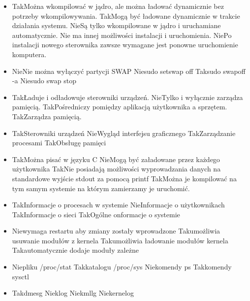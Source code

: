 \begin{itemize}
	\item {}
	{Tak}{Można wkompilować w jądro, ale można ładować dynamicznie bez potrzeby wkompilowywania.}
	{Tak}{Mogą być ładowane dynamicznie w trakcie działania systemu.}
	{Nie}{Są tylko wkompilowane w jądro i uruchamiane automatycznie. Nie ma innej możliwości instalacji i uruchomienia.}
	{Nie}{Po instalacji nowego sterownika zawsze wymagane jest ponowne uruchomienie komputera.}
	
	\item {}
	{Nie}{Nie można wyłączyć partycji SWAP}
	{Nie}{sudo setswap off}
	{Tak}{sudo swapoff -a}
	{Nie}{sudo swap stop}
	
	\item {}
	{Tak}{Ładuje i odładowuje sterowniki urządzeń.}
	{Nie}{Tylko i wyłącznie zarządza pamięcią.}
	{Tak}{Pośredniczy pomiędzy aplikacją użytkownika a sprzętem.}
	{Tak}{Zarządza pamięcią.}
	
	\item {}
	{Tak}{Sterowniki urządzeń}
	{Nie}{Wygląd interfejsu graficznego}
	{Tak}{Zarządzanie procesami}
	{Tak}{Obsługę pamięci}
	
	\item {}
	{Tak}{Można pisać w języku C}
	{Nie}{Mogą być załadowane przez każdego użytkownika}
	{Tak}{Nie posiadają możliwości wyprowadzania danych na standardowe wyjście stdout za pomocą printf}
	{Tak}{Można je kompilować na tym samym systemie na którym zamierzamy je uruchomić.}
	
	\item {}
	{Tak}{Informacje o procesach w systemie}
	{Nie}{Informacje o użytkownikach}
	{Tak}{Informacje o sieci}
	{Tak}{Ogólne onformacje o systemie}
	
	\item {}
	{Nie}{wymaga restartu aby zmiany zostały wprowadzone}
	{Tak}{umożliwia usuwanie modułów z kernela}
	{Tak}{umożliwia ładowanie modułów kernela}
	{Tak}{automatycznie dodaje moduły zależne}
	
	\item {}
	{Nie}{pliku /proc/stat}
	{Tak}{katalogu /proc/sys}
	{Nie}{komendy ps}
	{Tak}{komendy sysctl}
	
	\item {}
	{Tak}{dmesg}
	{Nie}{klog}
	{Nie}{kmllg}
	{Nie}{kernelog}
	
\end{itemize}